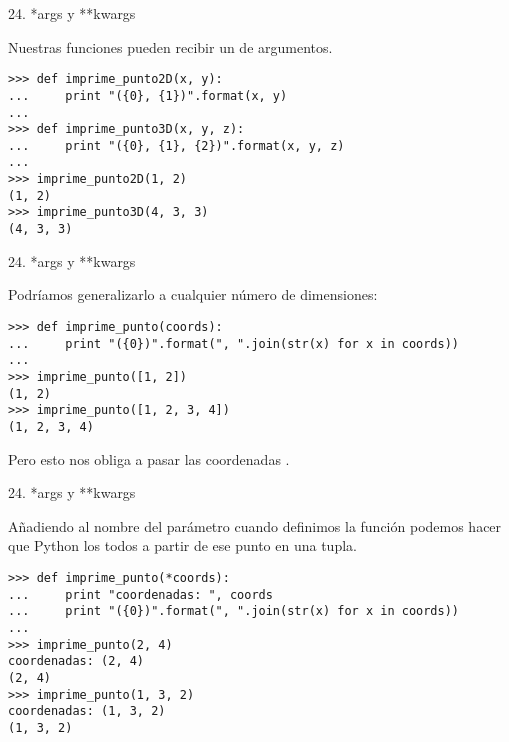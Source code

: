 
\begin{frame}[fragile]{24. *args y **kwargs}
  \begin{block}{}
    \small
    \centering
    Nuestras funciones pueden recibir un 
    de argumentos.
  \end{block}

  \begin{exampleblock}{}
    \footnotesize
    \begin{lstlisting}
>>> def imprime_punto2D(x, y):
...     print "({0}, {1})".format(x, y)
...
>>> def imprime_punto3D(x, y, z):
...     print "({0}, {1}, {2})".format(x, y, z)
...
>>> imprime_punto2D(1, 2)
(1, 2)
>>> imprime_punto3D(4, 3, 3)
(4, 3, 3)
    \end{lstlisting}
  \end{exampleblock}
\end{frame}

\begin{frame}[fragile]{24. *args y **kwargs}
  \begin{block}{}
    \small
    \centering
    Podríamos generalizarlo a cualquier número de dimensiones:
  \end{block}

  \begin{exampleblock}{}
    \scriptsize
    \begin{lstlisting}
>>> def imprime_punto(coords):
...     print "({0})".format(", ".join(str(x) for x in coords))
...
>>> imprime_punto([1, 2])
(1, 2)
>>> imprime_punto([1, 2, 3, 4])
(1, 2, 3, 4)
    \end{lstlisting}
  \end{exampleblock}

  \begin{alertblock}{}
    \small
    \centering
    Pero esto nos obliga a pasar las coordenadas .
  \end{alertblock}
\end{frame}

\begin{frame}[fragile]{24. *args y **kwargs}
  \begin{block}{}
    \small
    \centering
    Añadiendo  al nombre del parámetro cuando
    definimos la función podemos hacer que Python los
     todos a partir de ese punto en una tupla.
  \end{block}

  \begin{exampleblock}{}
    \scriptsize
    \begin{lstlisting}
>>> def imprime_punto(*coords):
...     print "coordenadas: ", coords
...     print "({0})".format(", ".join(str(x) for x in coords))
...
>>> imprime_punto(2, 4)
coordenadas: (2, 4)
(2, 4)
>>> imprime_punto(1, 3, 2)
coordenadas: (1, 3, 2)
(1, 3, 2)
    \end{lstlisting}
  \end{exampleblock}
\end{frame}

